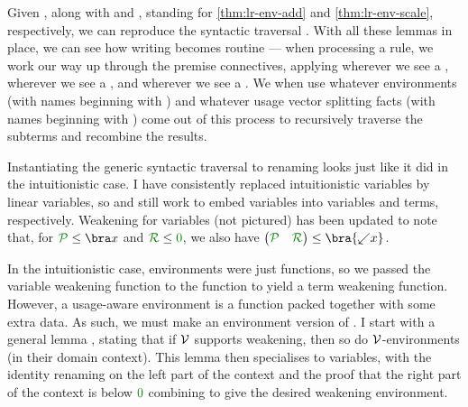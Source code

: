 
Given , along with  and
, standing for \cref{thm:lr-env-add} and
\cref{thm:lr-env-scale}, respectively, we can reproduce the syntactic traversal
.
With all these lemmas in place, we can see how writing 
becomes routine --- when processing a rule, we work our way up through the
premise connectives, applying  wherever we see a
,  wherever we see a
, and  wherever we see a
.
We when use whatever environments (with names beginning with
\AgdaBound{$\rho$}) and whatever usage vector splitting facts (with names
beginning with ) come out of this process to recursively
traverse the subterms and recombine the results.


Instantiating the generic syntactic traversal  to renaming
looks just like it did in the intuitionistic case.
I have consistently replaced intuitionistic variables by linear variables, so
 and  still work to embed
variables into variables and terms, respectively.
Weakening for variables  (not pictured) has been
updated to note that, for $\grP \leq \bra x$ and $\grR \leq \gr0$, we also have
$\begin{pmatrix} \grP & \grR \end{pmatrix} \leq \bra{{\swarrow}x}$.


In the intuitionistic case, environments were just functions, so we passed the
variable weakening function  to the function
 to yield a term weakening function.
However, a usage-aware environment is a function packed together with some
extra data.
As such, we must make an environment version of .
I start with a general lemma , stating that if
$\mathcal V$ supports weakening, then so do $\mathcal V$-environments (in their domain
context).
This lemma then specialises to variables, with the identity renaming
 on the left part of the context and the proof
 that the right part of the context is below $\gr0$ combining
to give the desired weakening environment.

